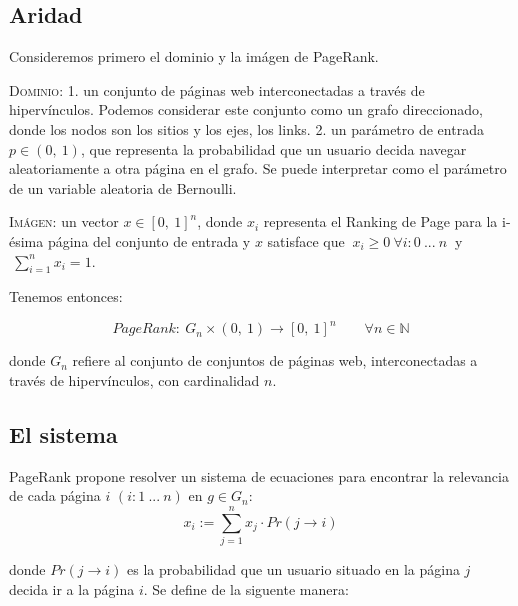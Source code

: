 \vspace{1em}

\subsection{Aridad} Consideremos primero el dominio y la imágen de PageRank. 

\vspace{1em}
\noindent \textsc{Dominio}: \textsc{1.} un conjunto de páginas web interconectadas a través de hipervínculos. Podemos considerar este conjunto como un grafo direccionado, donde los nodos son los sitios y los ejes, los links. \textsc{2.} un parámetro de entrada $p \in (0,\ 1)$, que representa la probabilidad que un usuario decida navegar aleatoriamente a otra página en el grafo. Se puede interpretar como el parámetro de un variable aleatoria de Bernoulli. 

\vspace{1em}
\noindent \textsc{Imágen}: un vector $x \in [0,\ 1]^{n}$, donde $x_i$ representa el Ranking de Page para la i-ésima página del conjunto de entrada y $x$ satisface que $\ x_i \geq 0\ \forall i:0\ ...\ n\ $ y $\ \sum_{i=1}^{n}{x_i} = 1$.

\vspace{1em}
\noindent Tenemos entonces:

\begin{equation}
    PageRank:\ G_n \times (0,\ 1) \longrightarrow [0,\ 1]^{n}\qquad \forall n \in \mathbb{N}
\end{equation}

\vspace{1em}
\noindent donde $G_n$ refiere al conjunto de conjuntos de páginas web, interconectadas a través de hipervínculos, con cardinalidad $n$.




\vspace{2em}
\subsection{El sistema} PageRank propone resolver un sistema de ecuaciones para encontrar la relevancia de cada página $i$ $(i: 1\ ...\ n)$ en $g \in G_n$:
\vspace{1em}
\begin{equation}
    x_i := \sum_{j=1}^{n} x_j \cdot Pr(j \longrightarrow i) 
\end{equation}

\vspace{1em}
\noindent donde $Pr(j \longrightarrow i)$ es la probabilidad que un usuario situado en la página $j$ decida ir a la página $i$. Se define de la siguente manera:

